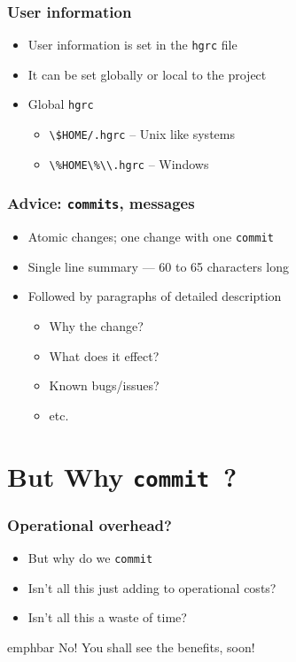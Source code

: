 \documentclass[14pt,compress]{beamer}
\newcommand{\emphbar}[1]
{\begin{beamercolorbox}[rounded=true]{emphbar} 
      {#1}
 \end{beamercolorbox}
}
\newcounter{time}
\newcommand{\typ}[1]{\lstinline{#1}}
\begin{document}
\begin{frame}
  \frametitle{User information}
  \begin{itemize}
  \item User information is set in the \typ{hgrc} file
  \item It can be set globally or local to the project
  \item Global \typ{hgrc}
    \begin{itemize}
    \item \typ{\$HOME/.hgrc} -- Unix like systems
    \item \typ{\%HOME\%\\.hgrc} -- Windows
    \end{itemize}
  \end{itemize}
\end{frame}

\begin{frame}
  \frametitle{\alert{Advice}: \typ{commits}, messages}
  \begin{itemize}
  \item Atomic changes; one change with one \typ{commit}
  \item Single line summary --- 60 to 65 characters long
  \item Followed by paragraphs of detailed description
    \begin{itemize}
    \item Why the change?
    \item What does it effect?
    \item Known bugs/issues?
    \item etc. 
    \end{itemize}
  \end{itemize}
\end{frame}

\section{But Why \typ{commit}~?}

\begin{frame}
  \frametitle{Operational overhead?}
  \begin{itemize}
  \item But why do we \typ{commit}
  \item Isn't all this just adding to operational costs?
  \item Isn't all this a waste of time?
  \end{itemize}
  \begin{center}
    \emphbar{No! You shall see the benefits, soon!}    
  \end{center}
\end{frame}
\end{document}
